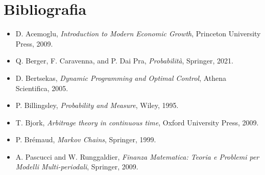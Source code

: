 \chapter*{Bibliografia}
\begin{itemize}
    \item [1] D. Acemoglu, \emph{Introduction to Modern Economic Growth}, Princeton University Press, 2009.
    \item [2] Q. Berger, F. Caravenna, and P. Dai Pra, \emph{Probabilità}, Springer, 2021.
    \item [3] D. Bertsekas, \emph{Dynamic Programming and Optimal Control}, Athena Scientifica, 2005.
    \item [5] P. Billingsley, \emph{Probability and Measure}, Wiley, 1995.
    \item [6] T. Bjork, \emph{Arbitrage theory in continuous time}, Oxford University Press, 2009.
    \item [7] P. Brémaud, \emph{Markov Chains}, Springer, 1999.
    \item [13] A. Pascucci and W. Runggaldier, \emph{Finanza Matematica: Teoria e Problemi per Modelli Multi-periodali}, Springer, 2009.
\end{itemize}
